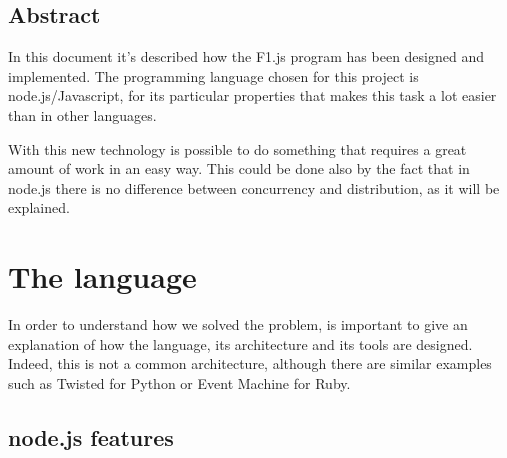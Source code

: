 
\def\PROJECT		{F1.js} %
\def\SUBTITLE		{Formula 1 in a concurrent yet distributed way}

\def\AUTHOR			{\ME}

\def\TABLES		{false} %
\def\FIGURES	{true} %



\newpage


\newpage

\hspace{1cm}
\begin{center}
\section*{Abstract}
\end{center}
In this document it's described how the F1.js program has been designed and implemented. The programming language chosen for this project is node.js/Javascript, for its particular properties that makes this task a lot easier than in other languages.

With this new technology is possible to do something that requires a great amount of work in an easy way. This could be done also by the fact that in node.js there is no difference between concurrency and distribution, as it will be explained.

\newpage
\section{The language}
In order to understand how we solved the problem, is important to give an explanation of how the language, its architecture and its tools are designed. Indeed, this is not a common architecture, although there are similar examples such as Twisted for Python or Event Machine for Ruby.

\subsection{node.js features}

